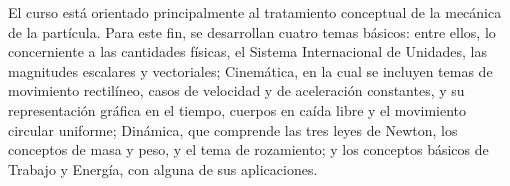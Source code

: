 \begin{syllabus}


\begin{justification}
El curso está orientado principalmente al tratamiento conceptual de la mecánica de la partícula. Para este fin, se desarrollan cuatro temas básicos: entre ellos, lo concerniente a las cantidades físicas, el Sistema Internacional de Unidades, las magnitudes escalares y vectoriales; Cinemática, en la cual se incluyen temas de movimiento rectilíneo, casos de velocidad y de aceleración constantes, y su representación gráfica en el tiempo, cuerpos en caída libre y el movimiento circular uniforme; Dinámica, que comprende las tres leyes de Newton, los conceptos de masa y peso, y el tema de rozamiento; y los conceptos básicos de Trabajo y Energía, con alguna de sus aplicaciones.
\end{justification}


\end{syllabus}
